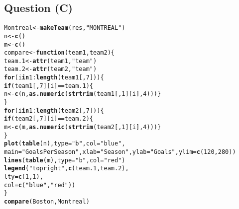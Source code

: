 \documentclass[12pt,letterpaper]{article}\usepackage[]{graphicx}\usepackage[]{color}
\makeatletter
\newcommand{\hlnum}[1]{\textcolor[rgb]{0.686,0.059,0.569}{#1}}%
\newcommand{\hlstr}[1]{\textcolor[rgb]{0.192,0.494,0.8}{#1}}%
\newcommand{\hlopt}[1]{\textcolor[rgb]{0,0,0}{#1}}%
\newcommand{\hlstd}[1]{\textcolor[rgb]{0.345,0.345,0.345}{#1}}%
\newcommand{\hlkwa}[1]{\textcolor[rgb]{0.161,0.373,0.58}{\textbf{#1}}}%
\newcommand{\hlkwb}[1]{\textcolor[rgb]{0.69,0.353,0.396}{#1}}%
\newcommand{\hlkwc}[1]{\textcolor[rgb]{0.333,0.667,0.333}{#1}}%
\newcommand{\hlkwd}[1]{\textcolor[rgb]{0.737,0.353,0.396}{\textbf{#1}}}%
\newenvironment{kframe}{%
 \def\at@end@of@kframe{}%
 \ifinner\ifhmode%
  \def\at@end@of@kframe{\end{minipage}}%
  \begin{minipage}{\columnwidth}%
 \fi\fi%
 \def\FrameCommand##1{\hskip\@totalleftmargin \hskip-\fboxsep
 \colorbox{shadecolor}{##1}\hskip-\fboxsep
     \hskip-\linewidth \hskip-\@totalleftmargin \hskip\columnwidth}%
 \MakeFramed {\advance\hsize-\width
   \@totalleftmargin\z@ \linewidth\hsize
   \@setminipage}}%
 {\par\unskip\endMakeFramed%
 \at@end@of@kframe}
\newenvironment{knitrout}{}{} %
\makeatother
\begin{document}
\newpage
\subsection{Question (C)}
\begin{knitrout}
\color{fgcolor}\begin{kframe}
\begin{alltt}
\hlstd{Montreal} \hlkwb{<-} \hlkwd{makeTeam}\hlstd{(res,} \hlstr{"MONTREAL"}\hlstd{)}
\hlstd{n} \hlkwb{<-} \hlkwd{c}\hlstd{()}
\hlstd{m} \hlkwb{<-} \hlkwd{c}\hlstd{()}
\hlstd{compare} \hlkwb{<-} \hlkwa{function}\hlstd{(}\hlkwc{team1}\hlstd{,} \hlkwc{team2}\hlstd{)\{}
  \hlstd{team.1} \hlkwb{<-} \hlkwd{attr}\hlstd{(team1,} \hlstr{"team"}\hlstd{)}
  \hlstd{team.2} \hlkwb{<-} \hlkwd{attr}\hlstd{(team2,} \hlstr{"team"}\hlstd{)}
  \hlkwa{for} \hlstd{(i} \hlkwa{in} \hlnum{1}\hlopt{:}\hlkwd{length}\hlstd{(team1[,}\hlnum{7}\hlstd{])) \{}
    \hlkwa{if}\hlstd{(team1[,}\hlnum{7}\hlstd{][i]} \hlopt{==} \hlstd{team.1)\{}
      \hlstd{n} \hlkwb{<-} \hlkwd{c}\hlstd{(n,} \hlkwd{as.numeric}\hlstd{(}\hlkwd{strtrim}\hlstd{(team1[,}\hlnum{1}\hlstd{][i],}\hlnum{4}\hlstd{)))\}}
  \hlstd{\}}
  \hlkwa{for} \hlstd{(i} \hlkwa{in} \hlnum{1}\hlopt{:}\hlkwd{length}\hlstd{(team2[,}\hlnum{7}\hlstd{])) \{}
    \hlkwa{if}\hlstd{(team2[,}\hlnum{7}\hlstd{][i]} \hlopt{==} \hlstd{team.2)\{}
      \hlstd{m} \hlkwb{<-} \hlkwd{c}\hlstd{(m,} \hlkwd{as.numeric}\hlstd{(}\hlkwd{strtrim}\hlstd{(team2[,}\hlnum{1}\hlstd{][i],}\hlnum{4}\hlstd{)))\}}
  \hlstd{\}}
    \hlkwd{plot}\hlstd{(}\hlkwd{table}\hlstd{(n),} \hlkwc{type} \hlstd{=} \hlstr{"b"}\hlstd{,} \hlkwc{col} \hlstd{=} \hlstr{"blue"}\hlstd{,}
         \hlkwc{main}\hlstd{=}\hlstr{"Goals Per Season"}\hlstd{,} \hlkwc{xlab}\hlstd{=}\hlstr{"Season"}\hlstd{,} \hlkwc{ylab}\hlstd{=}\hlstr{"Goals"}\hlstd{,}\hlkwc{ylim}\hlstd{=}\hlkwd{c}\hlstd{(}\hlnum{120}\hlstd{,}\hlnum{280}\hlstd{))}
    \hlkwd{lines}\hlstd{(}\hlkwd{table}\hlstd{(m),} \hlkwc{type} \hlstd{=} \hlstr{"b"}\hlstd{,} \hlkwc{col} \hlstd{=} \hlstr{"red"}\hlstd{)}
    \hlkwd{legend}\hlstd{(}\hlstr{"topright"}\hlstd{,} \hlkwd{c}\hlstd{(team.1, team.2),}
           \hlkwc{lty} \hlstd{=} \hlkwd{c}\hlstd{(}\hlnum{1}\hlstd{,}\hlnum{1}\hlstd{),}
           \hlkwc{col} \hlstd{=} \hlkwd{c}\hlstd{(}\hlstr{"blue"}\hlstd{,} \hlstr{"red"}\hlstd{))}
\hlstd{\}}
\hlkwd{compare}\hlstd{(Boston, Montreal)}
\end{alltt}
\end{kframe}
\end{knitrout}
\end{document}
